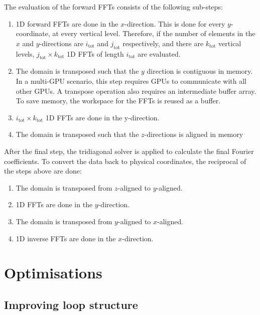 The evaluation of the forward FFTs consists of the following sub-steps:

\begin{enumerate}
    \item 1D forward FFTs are done in the $x$-direction. This is done for every $y$-coordinate, at every vertical level. Therefore, if the number of elements in the $x$ and $y$-directions are $i_{\text{tot}}$ and $j_{\text{tot}}$ respectively, and there are $k_{\text{tot}}$ vertical levels, $j_{\text{tot}} \times k_{\text{tot}}$ 1D FFTs of length $i_{\text{tot}}$ are evaluated.
    \item The domain is transposed such that the $y$ direction is contiguous in memory. In a multi-GPU scenario, this step requires GPUs to communicate with all other GPUs. A transpose operation also requires an intermediate buffer array. To save memory, the workspace for the FFTs is reused as a buffer.
    \item $i_{\text{tot}} \times k_{\text{tot}}$ 1D FFTs are done in the y-direction.
    \item The domain is transposed such that the $z$-directions is aligned in memory 
\end{enumerate}

After the final step, the tridiagonal solver is applied to calculate the final Fourier coefficients. To convert the data back to physical coordinates, the reciprocal of the steps above are done:

\begin{enumerate}
    \item The domain is transposed from $z$-aligned to $y$-aligned.
    \item 1D FFTs are done in the $y$-direction.
    \item The domain is transposed from $y$-aligned to $x$-aligned.
    \item 1D inverse FFTs are done in the $x$-direction.
\end{enumerate}

\section{Optimisations}

\subsection{Improving loop structure}

